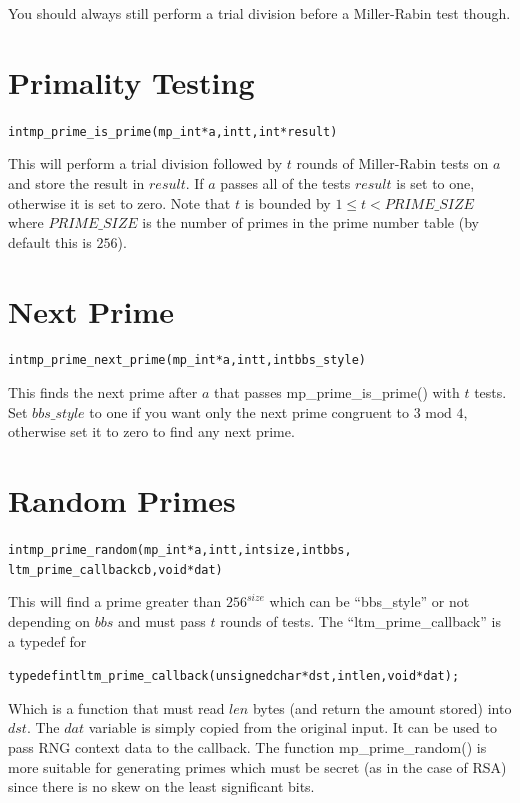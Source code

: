 \documentclass[synpaper]{book}
\begin{document}
You should always still perform a trial division before a Miller-Rabin test though.

\section{Primality Testing}
\begin{alltt}
int mp_prime_is_prime (mp_int * a, int t, int *result)
\end{alltt}
This will perform a trial division followed by $t$ rounds of Miller-Rabin tests on $a$ and store the result in $result$.  
If $a$ passes all of the tests $result$ is set to one, otherwise it is set to zero.  Note that $t$ is bounded by 
$1 \le t < PRIME\_SIZE$ where $PRIME\_SIZE$ is the number of primes in the prime number table (by default this is $256$).

\section{Next Prime}
\begin{alltt}
int mp_prime_next_prime(mp_int *a, int t, int bbs_style)
\end{alltt}
This finds the next prime after $a$ that passes mp\_prime\_is\_prime() with $t$ tests.  Set $bbs\_style$ to one if you 
want only the next prime congruent to $3 \mbox{ mod } 4$, otherwise set it to zero to find any next prime.  

\section{Random Primes}
\begin{alltt}
int mp_prime_random(mp_int *a, int t, int size, int bbs, 
                    ltm_prime_callback cb, void *dat)
\end{alltt}
This will find a prime greater than $256^{size}$ which can be ``bbs\_style'' or not depending on $bbs$ and must pass
$t$ rounds of tests.  The ``ltm\_prime\_callback'' is a typedef for 

\begin{alltt}
typedef int ltm_prime_callback(unsigned char *dst, int len, void *dat);
\end{alltt}

Which is a function that must read $len$ bytes (and return the amount stored) into $dst$.  The $dat$ variable is simply
copied from the original input.  It can be used to pass RNG context data to the callback.  The function 
mp\_prime\_random() is more suitable for generating primes which must be secret (as in the case of RSA) since there 
is no skew on the least significant bits.
\end{document}
